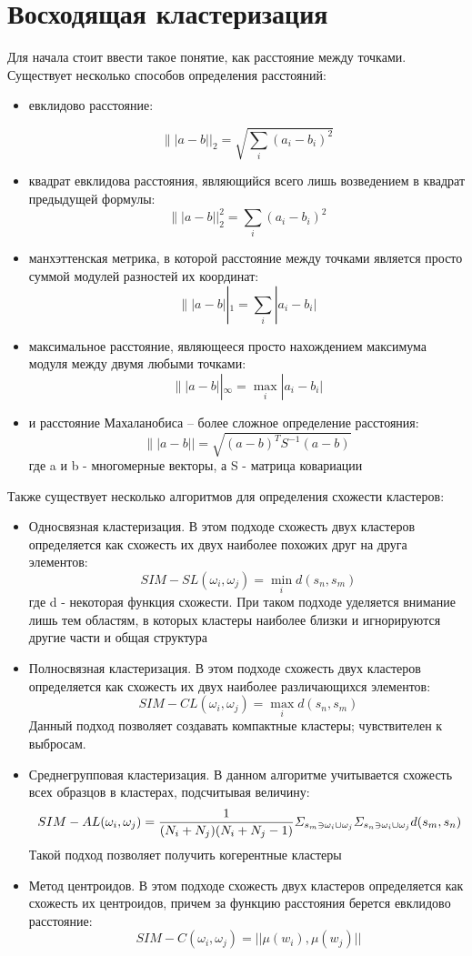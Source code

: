 \documentclass[12pt, a4paper]{article}
\begin{document}
\section*{Восходящая кластеризация}
Для начала стоит ввести такое понятие, как расстояние между точками. Существует несколько способов определения расстояний:
\begin{itemize}


\item евклидово расстояние:

\[
\||a-b||_2 = \sqrt{\sum_i (a_i-b_i)^2}
\]
\item квадрат евклидова расстояния, являющийся всего лишь возведением в квадрат предыдущей формулы:
\[
\||a-b||_2^2 = \sum_i (a_i-b_i)^2
\]
\item манхэттенская метрика, в которой расстояние между точками является просто суммой модулей разностей их координат:
\[
\||a-b||_1 = \sum_i |a_i-b_i|
\]
\item максимальное расстояние, являющееся просто нахождением максимума модуля между двумя любыми точками:
\[
\||a-b||_\infty = \max_i |a_i-b_i|
\]
\item и расстояние Махаланобиса – более сложное определение расстояния:
\[
\||a-b|| = \sqrt {(a-b)^T S^{-1} (a-b)}
\]
где a и b - многомерные векторы, а S - матрица ковариации
\end{itemize}

Также существует несколько алгоритмов для определения схожести кластеров:

\begin{itemize}
\item Односвязная кластеризация. В этом подходе схожесть двух кластеров определяется как схожесть их двух наиболее похожих друг на друга элементов:
\[
\ SIM-SL(\omega_i, \omega_j) =  \min_{i} d(s_{n},s_{m})
\]
где d - некоторая функция схожести. При таком подходе уделяется внимание лишь тем областям, в которых кластеры наиболее близки и игнорируются другие части и общая структура
\item Полносвязная кластеризация. В этом подходе схожесть двух кластеров определяется как схожесть их двух наиболее различающихся элементов:
\[
\ SIM-CL(\omega_i,\omega_j) =  \max_{i} d(s_{n},s_{m})
\]
Данный подход позволяет создавать компактные кластеры; чувствителен к выбросам.
\item Среднегрупповая кластеризация. В данном алгоритме учитывается схожесть всех образцов в кластерах, подсчитывая величину:
\[
\ SIM-AL(\omega_i,\omega_j) = \frac{1}{(N_{i} + N_{j})(N_{i} + N_{j} - 1)}{\mit\Sigma}_{{s_{m}}\ni\omega_i\cup\omega_j}{\mit\Sigma}_{{s_{n}}\ni\omega_i\cup\omega_j}
d(s_{m},s_{n})
\]
Такой подход позволяет получить когерентные кластеры
\item Метод центроидов. В этом подходе схожесть двух кластеров определяется как схожесть их центроидов, причем за функцию расстояния берется евклидово расстояние:
\[
\ SIM-C(\omega_i,\omega_j) =||\mu(w_i),\mu(w_j)||
\]
\end{itemize}
\end{document}
